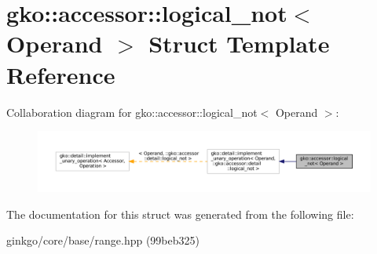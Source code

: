 \hypertarget{structgko_1_1accessor_1_1logical__not}{}\section{gko\+:\+:accessor\+:\+:logical\+\_\+not$<$ Operand $>$ Struct Template Reference}
\label{structgko_1_1accessor_1_1logical__not}


Collaboration diagram for gko\+:\+:accessor\+:\+:logical\+\_\+not$<$ Operand $>$\+:
\nopagebreak
\begin{figure}[H]
\begin{center}
\leavevmode
\includegraphics[width=350pt]{structgko_1_1accessor_1_1logical__not__coll__graph}
\end{center}
\end{figure}


The documentation for this struct was generated from the following file\+:\begin{DoxyCompactItemize}
\item 
ginkgo/core/base/range.\+hpp (99beb325)\end{DoxyCompactItemize}

